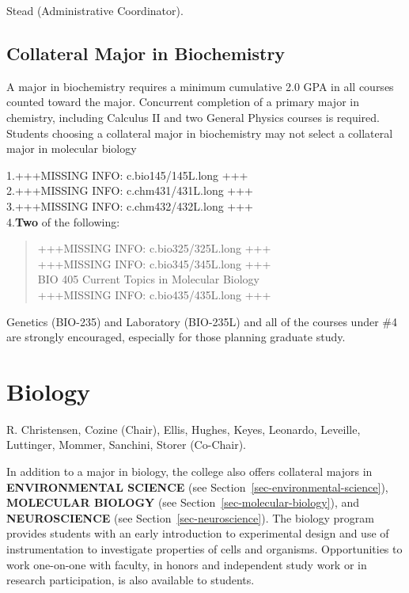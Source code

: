 \documentclass[
  letterpaper,
]{scrbook}
\begin{document}
Stead (Administrative Coordinator).

\subsection{Collateral Major in
Biochemistry}\label{collateral-major-in-biochemistry}

A major in biochemistry requires a minimum cumulative 2.0 GPA in all
courses counted toward the major. Concurrent completion of a primary
major in chemistry, including Calculus II and two General Physics
courses is required. Students choosing a collateral major in
biochemistry may not select a collateral major in molecular biology

1.+++MISSING INFO: c.bio145/145L.long +++\\
2.+++MISSING INFO: c.chm431/431L.long +++\\
3.+++MISSING INFO: c.chm432/432L.long +++\\
4.\textbf{Two} of the following:

\begin{quote}
+++MISSING INFO: c.bio325/325L.long +++\\
+++MISSING INFO: c.bio345/345L.long +++\\
BIO 405 Current Topics in Molecular Biology\\
+++MISSING INFO: c.bio435/435L.long +++
\end{quote}

Genetics (BIO-235) and Laboratory (BIO-235L) and all of the courses
under \#4 are strongly encouraged, especially for those planning
graduate study.

\section{Biology}\label{sec-biology}

R. Christensen, Cozine (Chair), Ellis, Hughes, Keyes, Leonardo,
Leveille, Luttinger, Mommer, Sanchini, Storer (Co-Chair).

In addition to a major in biology, the college also offers collateral
majors in \textbf{ENVIRONMENTAL SCIENCE} (see
Section~\ref{sec-environmental-science}), \textbf{MOLECULAR BIOLOGY}
(see Section~\ref{sec-molecular-biology}), and \textbf{NEUROSCIENCE}
(see Section~\ref{sec-neuroscience}). The biology program provides
students with an early introduction to experimental design and use of
instrumentation to investigate properties of cells and organisms.
Opportunities to work one-on-one with faculty, in honors and independent
study work or in research participation, is also available to students.
\end{document}
